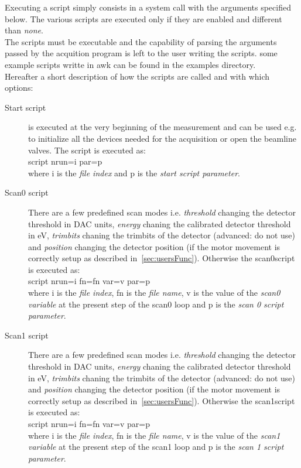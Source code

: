 Executing a script simply consists in a system call with the arguments specified below. The various scripts are executed only if they are enabled and different than \textit{none}. \\
The scripts must be executable and the capability of parsing the arguments passed by the acquition program is left to the user writing the scripts. some example scripts writte in awk can be found in the examples directory.\\
Hereafter a short description of how the scripts are called and with which options:
\begin{description}

\item[Start script]
     is executed at the very beginning of the measurement and can be used e.g. to initialize all the devices needed for the acquisition or open the beamline valves. The script is executed as:\\
      script  nrun=i par=p\\
      where i is the  \textit{file index} and p is the \textit{start script parameter}.

\item[Scan0 script]
  There are a few predefined scan modes i.e. \textit{threshold} changing the detector threshold in DAC units, \textit{energy} chaning the calibrated detector threshold in eV, \textit{trimbits} chaning the trimbits of the detector (advanced: do not use) and \textit{position} changing the detector position (if the motor movement is correctly setup as described in~\ref{sec:usersFunc}). Otherwise the scan0script is executed as:\\
 script nrun=i fn=fn var=v par=p\\
  where i is the  \textit{file index}, fn is the \textit{file name}, v is the value of the \textit{scan0 variable} at the present step of the scan0 loop and  p is the \textit{scan 0 script parameter}.

\item[Scan1 script]
  There are a few predefined scan modes i.e. \textit{threshold} changing the detector threshold in DAC units, \textit{energy} chaning the calibrated detector threshold in eV, \textit{trimbits} chaning the trimbits of the detector (advanced: do not use) and \textit{position} changing the detector position (if the motor movement is correctly setup as described in~\ref{sec:usersFunc}). Otherwise the scan1script is executed as:\\
 script nrun=i fn=fn var=v par=p\\
  where i is the  \textit{file index}, fn is the \textit{file name}, v is the value of the \textit{scan1 variable} at the present step of the scan1 loop and  p is the \textit{scan 1 script parameter}.


\end{description}
